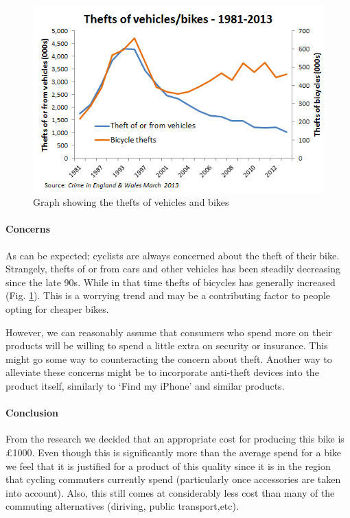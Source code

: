 \documentclass[a4paper]{report}
\begin{document}
\begin{figure}
\centering
\includegraphics[scale=0.8]{figures/cycle-theft}
\caption{Graph showing the thefts of vehicles and bikes \cite{ctc-stats}}
\label{fig:theft_graph}
\end{figure}
\paragraph{Concerns}
As can be expected; cyclists are always concerned about the theft of their bike. Strangely, thefts of or from cars and other vehicles has been steadily decreasing since the late 90s. While in that time thefts of bicycles has generally increased (Fig. \ref{fig:theft_graph}). This is a worrying trend and may be a contributing factor to people opting for cheaper bikes.

However, we can reasonably assume that consumers who spend more on their products will be  willing to spend a little extra on security or insurance. This might go some way to counteracting the concern about theft. Another way to alleviate these concerns might be to incorporate anti-theft devices into the product itself, similarly to ‘Find my iPhone’ and similar products.
\paragraph{Conclusion}
From the research we decided that an appropriate cost for producing this bike is \pounds1000. Even though this is significantly more than the average spend for a bike we feel that it is justified for a product of this quality since it is in the region that cycling commuters currently spend (particularly once accessories are taken into account). Also, this still comes at considerably less cost than many of the commuting alternatives (diriving, public transport,etc).
\end{document}
